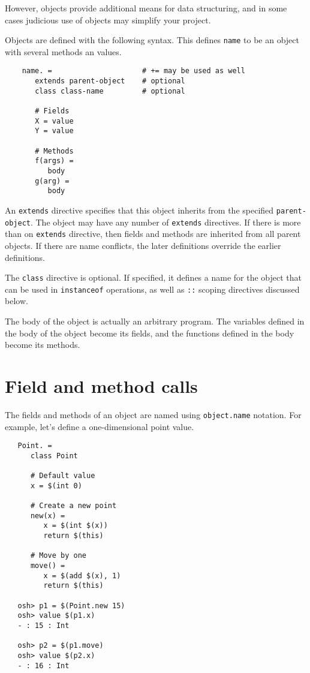 However, objects provide additional means for data structuring, and in some cases
judicious use of objects may simplify your project.

Objects are defined with the following syntax.  This defines \verb+name+
to be an object with several methods an values.

\begin{verbatim}
    name. =                     # += may be used as well
       extends parent-object    # optional
       class class-name         # optional

       # Fields
       X = value
       Y = value

       # Methods
       f(args) =
          body
       g(arg) =
          body
\end{verbatim}

An \verb+extends+ directive specifies that this object inherits from
the specified \verb+parent-object+.  The object may have any number of
\verb+extends+ directives.  If there is more than on \verb+extends+
directive, then fields and methods are inherited from all parent
objects.  If there are name conflicts, the later definitions override
the earlier definitions.

The \verb+class+ directive is optional.  If specified, it defines a name
for the object that can be used in \verb+instanceof+ operations, as well
as \verb+::+ scoping directives discussed below.

The body of the object is actually an arbitrary program.  The
variables defined in the body of the object become its fields, and the
functions defined in the body become its methods.

\section{Field and method calls}

The fields and methods of an object are named using \verb+object.name+ notation.
For example, let's define a one-dimensional point value.

\begin{verbatim}
   Point. =
      class Point

      # Default value
      x = $(int 0)

      # Create a new point
      new(x) =
         x = $(int $(x))
         return $(this)

      # Move by one
      move() =
         x = $(add $(x), 1)
         return $(this)

   osh> p1 = $(Point.new 15)
   osh> value $(p1.x)
   - : 15 : Int

   osh> p2 = $(p1.move)
   osh> value $(p2.x)
   - : 16 : Int
\end{verbatim}

